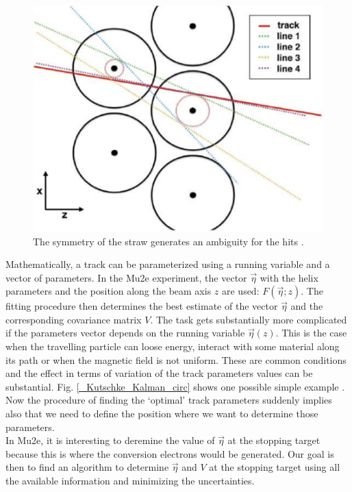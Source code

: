 \documentclass[12pt,a4paper,openright, oneside, titlepage]{book} %
\begin{document}
\begin{figure}[h!]
\centering
\includegraphics[scale=0.5]{giani_PatRec_ambiguity}
\caption[Hit ambiguity in a straw tube]{The symmetry of the straw generates an ambiguity for the hits \cite{GianiPatRec:2020}.}
\label{_ambiguity}
\end{figure}

\noindent Mathematically, a track can be parameterized using a running variable and a vector of parameters. 
In the Mu2e experiment, the vector $\vec{\eta}$ with the helix parameters and the position along the beam axis $z$ are used: $F(\vec{\eta};z)$. 
The fitting procedure then determines the best estimate of the vector $\vec{\eta}$ and the corresponding covariance matrix $V$. 
The task gets substantially more complicated if the parameters vector depends on the running variable $\vec{\eta}(z)$. 
This is the case when the travelling particle can loose energy, interact with some material along its path or when the magnetic field is not uniform. 
These are common conditions and the effect in terms of variation of the track parameters values can be substantial.
Fig. \ref{_Kutschke_Kalman_circ} shows one possible simple example \cite{Kutschke}.
Now the procedure of finding the `optimal' track parameters suddenly implies also that we need to define the position where we want to determine those parameters.\\
In Mu2e, it is interesting to deremine the value of $\vec{\eta}$ at the stopping target because this is where the conversion electrons would be generated. 
Our goal is then to find an algorithm to determine $\vec{\eta}$ and $V$ at the stopping target using all the available information and minimizing the uncertainties.\\
\end{document}
